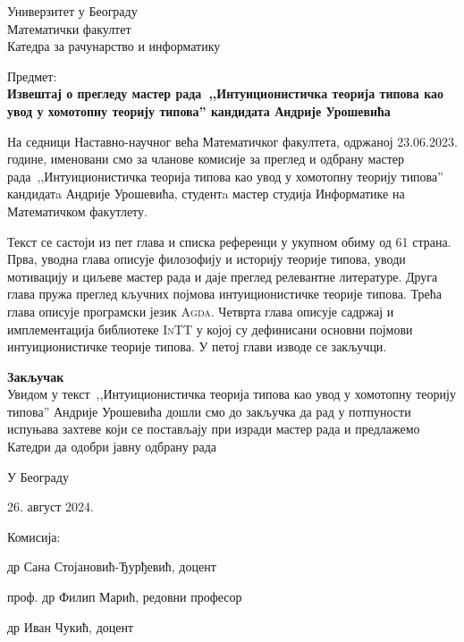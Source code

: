 \documentclass[a4paper]{letter}
\begin{document}
Универзитет у Београду\\
Математички факултет\\
Катедра за рачунарство и информатику

\vspace{2cm}

Предмет:\\
\textbf{Извештај о прегледу мастер рада~,,Интуиционистичка теорија типова као увод у хомотопну теорију типова'' кандидата Андрије Урошевића}

\vspace{0.6cm}

На седници Наставно-научног већа Математичког факултета, одржаној 23.06.2023. године,
именовани смо за чланове комисије за преглед и одбрану мастер рада~,,Интуиционистичка теорија типова као увод у хомотопну теорију типова'' кандидатa Андрије Урошевића, студентa
мастер студија Информатике на Математичком факутлету.

Текст се састоји из пет глава и списка референци у укупном обиму од 61 страна. Прва, уводна
глава описује филозофију и историју теорије типова, уводи мотивацију и циљеве мастер рада и даје преглед релевантне литературе. Друга глава пружа преглед
кључних појмова интуиционистичке теорије типова. Трећа
глава описује програмски језик \textsc{Agda}. Четврта глава описује садржај и имплементација библиотеке \textsc{InTT} у којој су дефинисани основни појмови интуиционистичке теорије типова. У петој глави изводе се закључци.

\vspace{0.4cm}

\textbf{Закључак}\\
Увидом у текст~,,Интуиционистичка теорија типова као увод у хомотопну теорију типова''
Андрије Урошевића дошли смо до закључка да рад у потпуности испуњава захтеве који се
постављају при изради мастер рада и предлажемо Катедри да одобри јавну одбрану рада

\vspace{1.2cm}

У Београду

26. август 2024.

\vspace{0.5cm}

Комисија:

др Сана Стојановић-Ђурђевић, доцент

проф. др Филип Марић, редовни професор

др Иван Чукић, доцент
\end{document}
